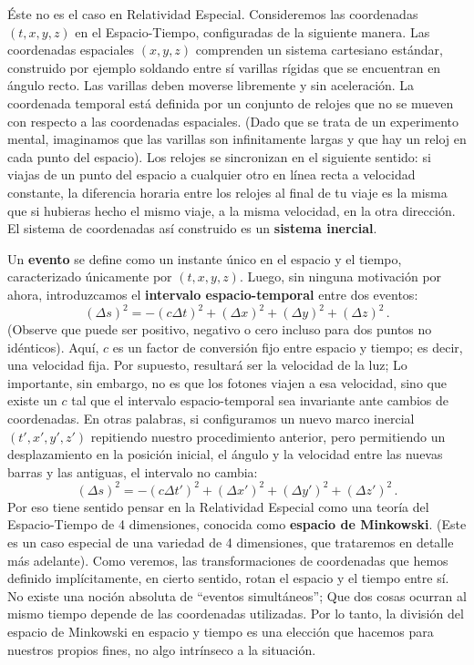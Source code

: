 \documentclass[11pt,b5paper,openany,twoside]{book}
\begin{document}
Éste no es el caso en Relatividad Especial.
Consideremos las coordenadas $(t,x,y,z)$ en el Espacio-Tiempo, configuradas de la siguiente manera.
Las coordenadas espaciales $(x,y,z)$ comprenden un sistema cartesiano estándar, construido por ejemplo soldando entre sí varillas rígidas que se encuentran en ángulo recto.
Las varillas deben moverse libremente y sin aceleración.
La coordenada temporal está definida por un conjunto de relojes que no se mueven con respecto a las coordenadas espaciales.
(Dado que se trata de un experimento mental, imaginamos que las varillas son infinitamente largas y que hay un reloj en cada punto del espacio).
Los relojes se sincronizan en el siguiente sentido: si viajas de un punto del espacio a cualquier otro en línea recta a velocidad constante, la diferencia horaria entre los relojes al final de tu viaje es la misma que si hubieras hecho el mismo viaje, a la misma velocidad, en la otra dirección.
El sistema de coordenadas así construido es un {\bf sistema inercial}.

Un {\bf evento} se define como un instante único en el espacio y el tiempo, caracterizado únicamente por $(t,x,y,z)$.
Luego, sin ninguna motivación por ahora, introduzcamos el {\bf intervalo espacio-temporal} entre dos eventos:
\begin{equation}
(\Delta s)^2 = -(c\Delta t)^2 + (\Delta x)^2 + (\Delta y)^2 + (\Delta z)^2\,.
\label{1.3}
\end{equation}
(Observe que puede ser positivo, negativo o cero incluso para dos puntos no idénticos).
Aquí, $c$ es un factor de conversión fijo entre espacio y tiempo; es decir, una velocidad fija.
Por supuesto, resultará ser la velocidad de la luz; Lo importante, sin embargo, no es que los fotones viajen a esa velocidad, sino que existe un $c$ tal que el intervalo espacio-temporal sea invariante ante cambios de coordenadas.
En otras palabras, si configuramos un nuevo marco inercial $(t',x',y',z')$ repitiendo nuestro procedimiento anterior, pero permitiendo un desplazamiento en la posición inicial, el ángulo y la velocidad entre las nuevas barras y las antiguas, el intervalo no cambia:
\begin{equation}
(\Delta s)^2 = -(c\Delta t')^2 + (\Delta x')^2 + (\Delta y')^2 + (\Delta z')^2\,.
\label{1.4}
\end{equation}
Por eso tiene sentido pensar en la Relatividad Especial como una teoría del Espacio-Tiempo de 4 dimensiones, conocida como {\bf espacio de Minkowski}.
(Este es un caso especial de una variedad de 4 dimensiones, que trataremos en detalle más adelante).
Como veremos, las transformaciones de coordenadas que hemos definido implícitamente, en cierto sentido, rotan el espacio y el tiempo entre sí.
No existe una noción absoluta de ``eventos simultáneos''; Que dos cosas ocurran al mismo tiempo depende de las coordenadas utilizadas.
Por lo tanto, la división del espacio de Minkowski en espacio y tiempo es una elección que hacemos para nuestros propios fines, no algo intrínseco a la situación.
\end{document}

